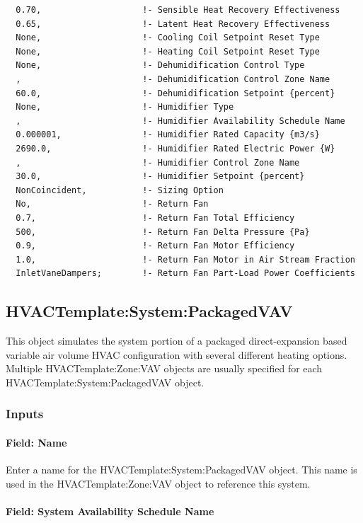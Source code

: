 \begin{lstlisting}
  0.70,                    !- Sensible Heat Recovery Effectiveness
  0.65,                    !- Latent Heat Recovery Effectiveness
  None,                    !- Cooling Coil Setpoint Reset Type
  None,                    !- Heating Coil Setpoint Reset Type
  None,                    !- Dehumidification Control Type
  ,                        !- Dehumidification Control Zone Name
  60.0,                    !- Dehumidification Setpoint {percent}
  None,                    !- Humidifier Type
  ,                        !- Humidifier Availability Schedule Name
  0.000001,                !- Humidifier Rated Capacity {m3/s}
  2690.0,                  !- Humidifier Rated Electric Power {W}
  ,                        !- Humidifier Control Zone Name
  30.0,                    !- Humidifier Setpoint {percent}
  NonCoincident,           !- Sizing Option
  No,                      !- Return Fan
  0.7,                     !- Return Fan Total Efficiency
  500,                     !- Return Fan Delta Pressure {Pa}
  0.9,                     !- Return Fan Motor Efficiency
  1.0,                     !- Return Fan Motor in Air Stream Fraction
  InletVaneDampers;        !- Return Fan Part-Load Power Coefficients
\end{lstlisting}

\subsection{HVACTemplate:System:PackagedVAV}\label{hvactemplatesystempackagedvav}

This object simulates the system portion of a packaged direct-expansion based variable air volume HVAC configuration with several different heating options. Multiple HVACTemplate:Zone:VAV objects are usually specified for each HVACTemplate:System:PackagedVAV object.

\subsubsection{Inputs}\label{inputs-19-002}

\paragraph{Field: Name}\label{field-name-6-008}

Enter a name for the HVACTemplate:System:PackagedVAV object. This name is used in the HVACTemplate:Zone:VAV object to reference this system.

\paragraph{Field: System Availability Schedule Name}\label{field-system-availability-schedule-name-11}

